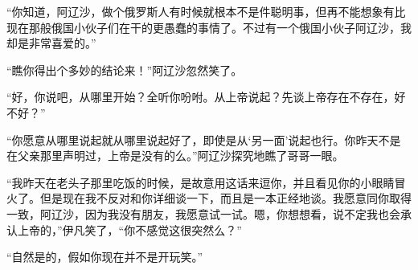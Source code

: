 \par “你知道，阿辽沙，做个俄罗斯人有时候就根本不是件聪明事，但再不能想象有比现在那般俄国小伙子们在干的更愚蠢的事情了。不过有一个俄国小伙子阿辽沙，我却是非常喜爱的。”
\par “瞧你得出个多妙的结论来！”阿辽沙忽然笑了。
\par “好，你说吧，从哪里开始？全听你吩咐。从上帝说起？先谈上帝存在不存在，好不好？”
\par “你愿意从哪里说起就从哪里说起好了，即使是从‘另一面’说起也行。你昨天不是在父亲那里声明过，上帝是没有的么。”阿辽沙探究地瞧了哥哥一眼。
\par “我昨天在老头子那里吃饭的时候，是故意用这话来逗你，并且看见你的小眼睛冒火了。但是现在我不反对和你详细谈一下，而且是一本正经地谈。我愿意同你取得一致，阿辽沙，因为我没有朋友，我愿意试一试。嗯，你想想看，说不定我也会承认上帝的，”伊凡笑了，“你不感觉这很突然么？”
\par “自然是的，假如你现在并不是开玩笑。”
